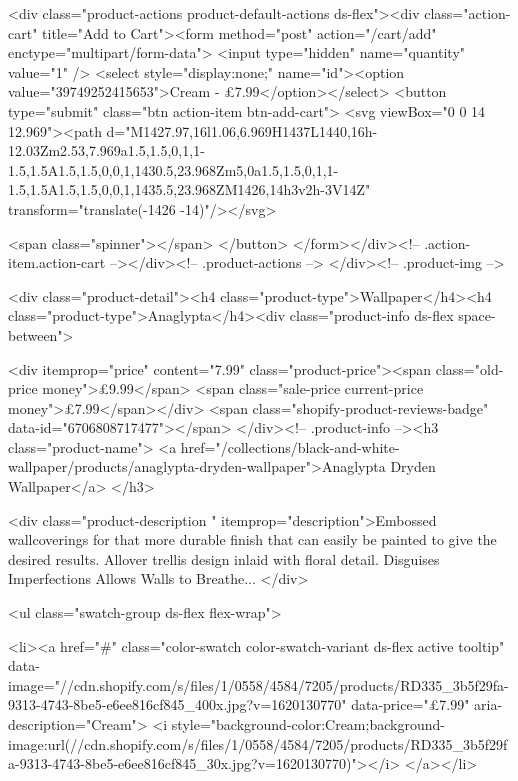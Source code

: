 {{{{{{{<div class="product-actions product-default-actions ds-flex"><div class="action-cart" title="Add to Cart"><form method="post" action="/cart/add" enctype="multipart/form-data">
            <input type="hidden" name="quantity" value="1" />
            <select style="display:none;" name="id"><option value="39749252415653">Cream - £7.99</option></select>
            <button type="submit" class="btn action-item btn-add-cart">
              <svg viewBox="0 0 14 12.969"><path d="M1427.97,16l1.06,6.969H1437L1440,16h-12.03Zm2.53,7.969a1.5,1.5,0,1,1-1.5,1.5A1.5,1.5,0,0,1,1430.5,23.968Zm5,0a1.5,1.5,0,1,1-1.5,1.5A1.5,1.5,0,0,1,1435.5,23.968ZM1426,14h3v2h-3V14Z" transform="translate(-1426 -14)"/></svg>

              <span class="spinner"></span>
            </button>
          </form></div><!-- .action-item.action-cart --></div><!-- .product-actions -->
</div><!-- .product-img -->

<div class="product-detail"><h4 class="product-type">Wallpaper</h4><h4 class="product-type">Anaglypta</h4><div class="product-info ds-flex space-between">
    
<div itemprop="price" content="7.99" class="product-price"><span class="old-price money">£9.99</span>
    <span class="sale-price current-price money">£7.99</span></div>
    <span class="shopify-product-reviews-badge" data-id="6706808717477"></span>
  </div><!-- .product-info --><h3 class="product-name">
      <a href="/collections/black-and-white-wallpaper/products/anaglypta-dryden-wallpaper">Anaglypta Dryden Wallpaper</a>
    </h3>
    
<div class="product-description " itemprop="description">Embossed wallcoverings for that more durable finish that can easily be painted to give the desired results. Allover trellis design inlaid with floral detail. Disguises Imperfections Allows Walls to Breathe...
</div>



<ul class="swatch-group ds-flex flex-wrap">
        
<li><a href="#" class="color-swatch color-swatch-variant ds-flex active tooltip" data-image="//cdn.shopify.com/s/files/1/0558/4584/7205/products/RD335_3b5f29fa-9313-4743-8be5-e6ee816cf845_400x.jpg?v=1620130770" data-price="£7.99" aria-description="Cream">
              <i style="background-color:Cream;background-image:url(//cdn.shopify.com/s/files/1/0558/4584/7205/products/RD335_3b5f29fa-9313-4743-8be5-e6ee816cf845_30x.jpg?v=1620130770)"></i>
            </a></li>

}}}}}}}

